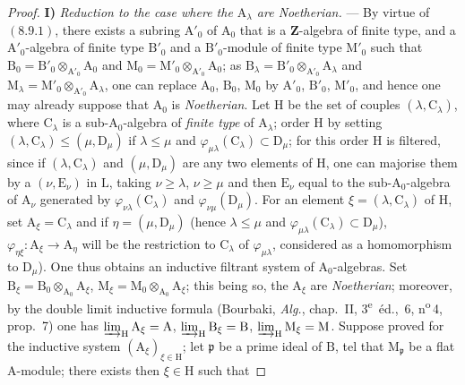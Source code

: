 \begin{proof}
\medskip
\noindent\textbf{I)} \emph{Reduction to the case where the $\mathrm{A}_\lambda$ are Noetherian.} --- By virtue of $(8.9.1)$, there exists a subring $\mathrm{A}'_0$ of $\mathrm{A}_0$ that is a $\mathbf{Z}$-algebra of finite type, and a $\mathrm{A}'_0$-algebra of finite type $\mathrm{B}'_0$ and a $\mathrm{B}'_0$-module of finite type $\mathrm{M}'_0$ such that $\mathrm{B}_0=\mathrm{B}'_0\otimes_{\mathrm{A}'_0}\mathrm{A}_0$ and $\mathrm{M}_0=\mathrm{M}'_0\otimes_{\mathrm{A}'_0}\mathrm{A}_0$; as $\mathrm{B}_\lambda=\mathrm{B}'_0\otimes_{\mathrm{A}'_0}\mathrm{A}_\lambda$ and $\mathrm{M}_\lambda=\mathrm{M}'_0\otimes_{\mathrm{A}'_0}\mathrm{A}_\lambda$, one can replace $\mathrm{A}_0$, $\mathrm{B}_0$, $\mathrm{M}_0$ by $\mathrm{A}'_0$, $\mathrm{B}'_0$, $\mathrm{M}'_0$, and hence one may already suppose that $\mathrm{A}_0$ is \emph{Noetherian}. Let $\mathrm{H}$ be the set of couples $(\lambda,\mathrm{C}_\lambda)$, where $\mathrm{C}_\lambda$ is a sub-$\mathrm{A}_0$-algebra of \emph{finite type} of $\mathrm{A}_\lambda$; order $\mathrm{H}$ by setting $(\lambda,\mathrm{C}_\lambda)\leqslant(\mu,\mathrm{D}_\mu)$ if $\lambda\leqslant\mu$ and $\varphi_{\mu\lambda}(\mathrm{C}_\lambda)\subset\mathrm{D}_\mu$; for this order $\mathrm{H}$ is filtered, since if $(\lambda,\mathrm{C}_\lambda)$ and $(\mu,\mathrm{D}_\mu)$ are any two elements of $\mathrm{H}$, one can majorise them by a $(\nu,\mathrm{E}_\nu)$ in $\mathrm{L}$, taking $\nu\geqslant\lambda$, $\nu\geqslant\mu$ and then $\mathrm{E}_\nu$ equal to the sub-$\mathrm{A}_0$-algebra of $\mathrm{A}_\nu$ generated by $\varphi_{\nu\lambda}(\mathrm{C}_\lambda)$ and $\varphi_{\nu\mu}(\mathrm{D}_\mu)$. For an element $\xi=(\lambda,\mathrm{C}_\lambda)$ of $\mathrm{H}$, set $\mathrm{A}_\xi=\mathrm{C}_\lambda$ and if $\eta=(\mu,\mathrm{D}_\mu)$ (hence $\lambda\leqslant\mu$ and $\varphi_{\mu\lambda}(\mathrm{C}_\lambda)\subset\mathrm{D}_\mu$), $\varphi_{\eta\xi}:\mathrm{A}_\xi\to\mathrm{A}_\eta$ will be the restriction to $\mathrm{C}_\lambda$ of $\varphi_{\mu\lambda}$, considered as a homomorphism to $\mathrm{D}_\mu$). One thus obtains an inductive filtrant system of $\mathrm{A}_0$-algebras. Set $\mathrm{B}_\xi=\mathrm{B}_0\otimes_{\mathrm{A}_0}\mathrm{A}_\xi$, $\mathrm{M}_\xi=\mathrm{M}_0\otimes_{\mathrm{A}_0}\mathrm{A}_\xi$; this being so, the $\mathrm{A}_\xi$ are \emph{Noetherian}; moreover, by the double limit inductive formula (Bourbaki, \emph{Alg.}, chap.~II, 3\textsuperscript{e}~\'{e}d., \textsection\,6, n\textsuperscript{o}\,4, prop.~7) one has $\varinjlim_{\mathrm{H}}\mathrm{A}_\xi=\mathrm{A}$, $\varinjlim_{\mathrm{H}}\mathrm{B}_\xi=\mathrm{B}$, $\varinjlim_{\mathrm{H}}\mathrm{M}_\xi=\mathrm{M}$. Suppose  proved for the inductive system $(\mathrm{A}_\xi)_{\xi\in\mathrm{H}}$; let $\mathfrak{p}$ be a prime ideal of $\mathrm{B}$, tel that $\mathrm{M}_\mathfrak{p}$ be a flat $\mathrm{A}$-module; there exists then $\xi\in\mathrm{H}$ such that

\end{proof}
